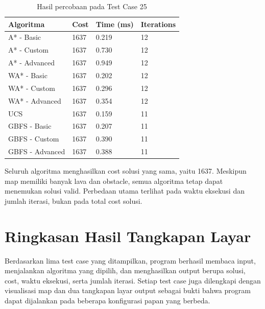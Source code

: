 \begin{table}[H]
	\centering
	\caption{Hasil percobaan pada Test Case 25}
	\small
	\begin{tabular}{|p{4cm}|p{2.5cm}|p{2.5cm}|p{2.5cm}|}
		\hline
		\rowcolor{gray!20}
		\textbf{Algoritma} & \textbf{Cost} & \textbf{Time (ms)} & \textbf{Iterations} \\
		\hline
		A* - Basic & 1637 & 0.219 & 12 \\
		\hline
		A* - Custom & 1637 & 0.730 & 12 \\
		\hline
		A* - Advanced & 1637 & 0.949 & 12 \\
		\hline
		WA* - Basic & 1637 & 0.202 & 12 \\
		\hline
		WA* - Custom & 1637 & 0.296 & 12 \\
		\hline
		WA* - Advanced & 1637 & 0.354 & 12 \\
		\hline
		UCS & 1637 & 0.159 & 11 \\
		\hline
		GBFS - Basic & 1637 & 0.207 & 11 \\
		\hline
		GBFS - Custom & 1637 & 0.390 & 11 \\
		\hline
		GBFS - Advanced & 1637 & 0.388 & 11 \\
		\hline
	\end{tabular}
\end{table}

\begin{tcolorbox}[
	colback=green!5,
	colframe=green!50!black,
	title=\textbf{Ringkasan Test Case 25},
	arc=2mm,
	boxrule=0.8pt
]
Seluruh algoritma menghasilkan cost solusi yang sama, yaitu 1637. 
Meskipun map memiliki banyak lava dan obstacle, semua algoritma tetap dapat menemukan solusi valid. 
Perbedaan utama terlihat pada waktu eksekusi dan jumlah iterasi, bukan pada total cost solusi.
\end{tcolorbox}


\section{Ringkasan Hasil Tangkapan Layar}

Berdasarkan lima test case yang ditampilkan, program berhasil membaca input, menjalankan algoritma yang dipilih, dan menghasilkan output berupa solusi, cost, waktu eksekusi, serta jumlah iterasi. 
Setiap test case juga dilengkapi dengan visualisasi map dan dua tangkapan layar output sebagai bukti bahwa program dapat dijalankan pada beberapa konfigurasi papan yang berbeda.


